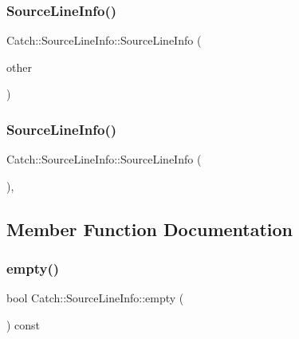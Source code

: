 \subsubsection{SourceLineInfo()\hspace{0.1cm}{\footnotesize\ttfamily [3/4]}}
{\footnotesize\ttfamily Catch\+::\+Source\+Line\+Info\+::\+Source\+Line\+Info (\begin{DoxyParamCaption}\item[{\textbf{ Source\+Line\+Info} const \&}]{other }\end{DoxyParamCaption})\hspace{0.3cm}{\ttfamily [default]}}

\mbox{\label{struct_catch_1_1_source_line_info_a5ea6179645457b8ec961aec9ca4c5588}} 
\subsubsection{SourceLineInfo()\hspace{0.1cm}{\footnotesize\ttfamily [4/4]}}
{\footnotesize\ttfamily Catch\+::\+Source\+Line\+Info\+::\+Source\+Line\+Info (\begin{DoxyParamCaption}\item[{\textbf{ Source\+Line\+Info} \&\&}]{ }\end{DoxyParamCaption})\hspace{0.3cm}{\ttfamily [default]}, {\ttfamily [noexcept]}}



\subsection{Member Function Documentation}
\mbox{\label{struct_catch_1_1_source_line_info_a10a5b5b7dff82971879c2eb8d83f9b3b}} 
\subsubsection{empty()}
{\footnotesize\ttfamily bool Catch\+::\+Source\+Line\+Info\+::empty (\begin{DoxyParamCaption}{ }\end{DoxyParamCaption}) const\hspace{0.3cm}{\ttfamily [noexcept]}}

